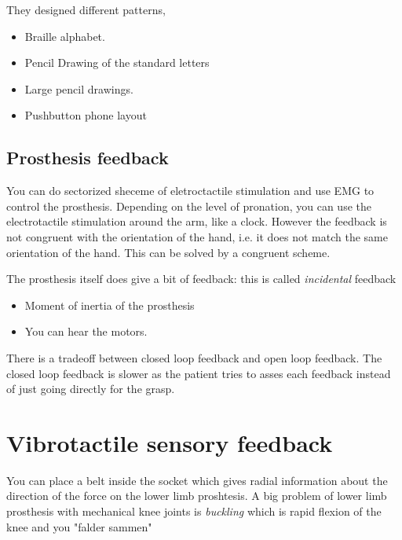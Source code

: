 \documentclass[a4paper]{article}
\begin{document}
\vspace{5pt}

They designed different patterns, 
\begin{itemize}
	\item Braille alphabet. 
	\item Pencil Drawing of the standard letters 
	\item Large pencil drawings.
	\item Pushbutton phone layout
\end{itemize}


\subsection{Prosthesis feedback}
You can do sectorized sheceme of eletroctactile stimulation and use EMG to control the prosthesis. Depending on the level of pronation, you can use the electrotactile stimulation around the arm, like a clock. However the feedback is not congruent with the orientation of the hand, i.e. it does not match the same orientation of the hand. This can be solved by a congruent scheme. 

The prosthesis itself does give a bit of feedback: this is called \textit{incidental} feedback 
\begin{itemize}
	\item Moment of inertia of the prosthesis
	\item You can hear the motors.
\end{itemize}

There is a tradeoff between closed loop feedback and open loop feedback. The closed loop feedback is slower as the patient tries to asses each feedback instead of just going directly for the grasp. 


\section{Vibrotactile sensory feedback}
You can place a belt inside the socket which gives radial information about the direction of the force on the lower limb proshtesis. A big problem of lower limb prosthesis with mechanical knee joints is \textit{buckling} which is rapid flexion of the knee and you "falder sammen" 
\end{document}
